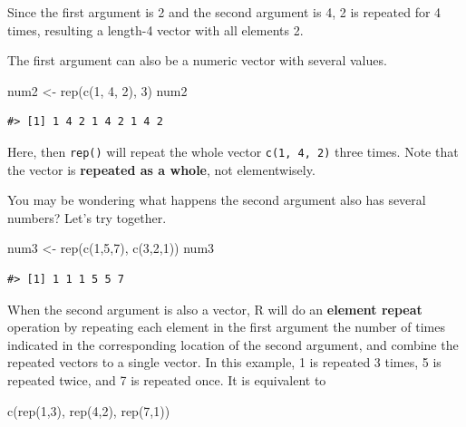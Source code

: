 \documentclass[
]{book}
\newenvironment{Shaded}{\begin{snugshade}}{\end{snugshade}}
\newcommand{\DecValTok}[1]{\textcolor[rgb]{0.00,0.00,0.81}{#1}}
\newcommand{\FunctionTok}[1]{\textcolor[rgb]{0.00,0.00,0.00}{#1}}
\newcommand{\NormalTok}[1]{#1}
\newcommand{\OtherTok}[1]{\textcolor[rgb]{0.56,0.35,0.01}{#1}}
\begin{document}
Since the first argument is 2 and the second argument is 4, 2 is repeated for 4 times, resulting a length-4 vector with all elements 2.

The first argument can also be a numeric vector with several values.

\begin{Shaded}
\begin{Highlighting}[]
\NormalTok{num2 }\OtherTok{\textless{}{-}} \FunctionTok{rep}\NormalTok{(}\FunctionTok{c}\NormalTok{(}\DecValTok{1}\NormalTok{, }\DecValTok{4}\NormalTok{, }\DecValTok{2}\NormalTok{), }\DecValTok{3}\NormalTok{)}
\NormalTok{num2}
\end{Highlighting}
\end{Shaded}

\begin{verbatim}
#> [1] 1 4 2 1 4 2 1 4 2
\end{verbatim}

Here, then \texttt{rep()} will repeat the whole vector \texttt{c(1,\ 4,\ 2)} three times. Note that the vector is \textbf{repeated as a whole}, not elementwisely.

You may be wondering what happens the second argument also has several numbers? Let's try together.

\begin{Shaded}
\begin{Highlighting}[]
\NormalTok{num3 }\OtherTok{\textless{}{-}} \FunctionTok{rep}\NormalTok{(}\FunctionTok{c}\NormalTok{(}\DecValTok{1}\NormalTok{,}\DecValTok{5}\NormalTok{,}\DecValTok{7}\NormalTok{), }\FunctionTok{c}\NormalTok{(}\DecValTok{3}\NormalTok{,}\DecValTok{2}\NormalTok{,}\DecValTok{1}\NormalTok{))}
\NormalTok{num3}
\end{Highlighting}
\end{Shaded}

\begin{verbatim}
#> [1] 1 1 1 5 5 7
\end{verbatim}

When the second argument is also a vector, R will do an \textbf{element repeat} operation by repeating each element in the first argument the number of times indicated in the corresponding location of the second argument, and combine the repeated vectors to a single vector. In this example, 1 is repeated 3 times, 5 is repeated twice, and 7 is repeated once. It is equivalent to

\begin{Shaded}
\begin{Highlighting}[]
\FunctionTok{c}\NormalTok{(}\FunctionTok{rep}\NormalTok{(}\DecValTok{1}\NormalTok{,}\DecValTok{3}\NormalTok{), }\FunctionTok{rep}\NormalTok{(}\DecValTok{4}\NormalTok{,}\DecValTok{2}\NormalTok{), }\FunctionTok{rep}\NormalTok{(}\DecValTok{7}\NormalTok{,}\DecValTok{1}\NormalTok{))}
\end{Highlighting}
\end{Shaded}
\end{document}
